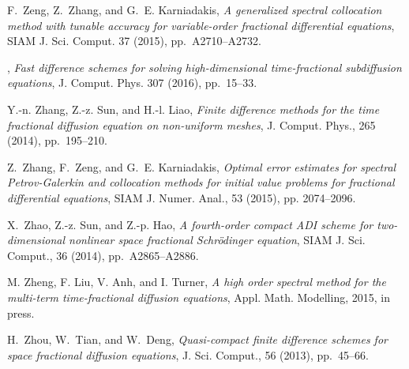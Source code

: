 \documentclass[10pt]{siamltex}
\begin{document}
\begin{thebibliography}{10}
{\sc F.~Zeng, Z.~Zhang, and G.~E. Karniadakis}, {\em A generalized spectral
  collocation method with tunable accuracy for variable-order fractional
  differential equations}, SIAM J. Sci. Comput. 37 (2015), pp.~A2710--A2732.

\leavevmode\vrule height 2pt depth -1.6pt width 23pt, {\em Fast difference schemes for solving high-dimensional time-fractional subdiffusion equations}, J. Comput. Phys. 307 (2016), pp.~15--33.






{\sc Y.-n. Zhang, Z.-z. Sun, and H.-l. Liao}, {\em Finite difference methods
  for the time fractional diffusion equation on non-uniform meshes}, J. Comput.
  Phys., 265 (2014), pp.~195--210.

{\sc Z.~Zhang, F.~Zeng, and G.~E. Karniadakis}, {\em Optimal error estimates
  for spectral {P}etrov-{G}alerkin and collocation methods for initial value
  problems for fractional differential equations}, SIAM J. Numer. Anal., 53 (2015),  pp. 2074--2096.


{\sc X.~Zhao, Z.-z. Sun, and Z.-p. Hao}, {\em A fourth-order compact {ADI}
  scheme for two-dimensional nonlinear space fractional {S}chr\"odinger
  equation}, SIAM J. Sci. Comput., 36 (2014), pp.~A2865--A2886.


{\sc M. Zheng, F. Liu, V. Anh, and I. Turner}, {\em A high order spectral method for the multi-term time-fractional diffusion equations}, Appl. Math. Modelling, 2015, in press.



{\sc H.~Zhou, W.~Tian, and W.~Deng}, {\em Quasi-compact finite difference
  schemes for space fractional diffusion equations}, J. Sci. Comput., 56
  (2013), pp.~45--66.

%
%
%
\end{thebibliography}
\end{document}

